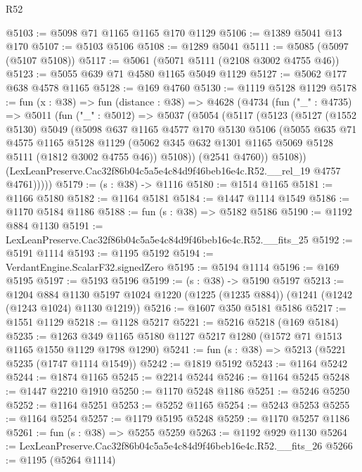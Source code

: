 \begin{lexlean}{R52}
\begin{coremodule}
@5103 := @5098 @71 @1165 @1165 @170 @1129
@5106 := @1389 @5041 @13 @170
@5107 := @5103 @5106
@5108 := @1289 @5041
@5111 := @5085 (@5097 (@5107 @5108))
@5117 := @5061 (@5071 @5111 (@2108 @3002 @4755 @46))
@5123 := @5055 @639 @71 @4580 @1165 @5049 @1129
@5127 := @5062 @177 @638 @4578 @1165
@5128 := @169 @4760
@5130 := @1119 @5128 @1129
@5178 := fun (x : @38) =>
  fun (distance : @38) =>
  @4628
    (@4734
      (fun ("_" : @4735) =>
      @5011
        (fun ("_" : @5012) =>
        @5037
          (@5054
            (@5117
              (@5123
                (@5127
                  (@1552 @5130)
                  @5049
                  (@5098
                    @637
                    @1165
                    @4577
                    @170
                    @5130
                    @5106
                    (@5055
                      @635
                      @71
                      @4575
                      @1165
                      @5128
                      @1129
                      (@5062 @345 @632 @1301 @1165 @5069 @5128 @5111 (@1812 @3002 @4755 @46))
                      @5108))
                  (@2541 @4760))
                @5108))
            (LexLeanPreserve.Cac32f86b04c5a5e4c84d9f46beb16e4c.R52.__rel_19 @4757 @4761)))))
@5179 := (s : @38) -> @1116
@5180 := @1514 @1165
@5181 := @1166 @5180
@5182 := @1164 @5181
@5184 := @1447 @1114 @1549
@5186 := @1170 @5184 @1186
@5188 := fun (s : @38) => @5182 @5186
@5190 := @1192 @884 @1130
@5191 := LexLeanPreserve.Cac32f86b04c5a5e4c84d9f46beb16e4c.R52.__fits_25
@5192 := @5191 @1114
@5193 := @1195 @5192
@5194 := VerdantEngine.ScalarF32.signedZero
@5195 := @5194 @1114
@5196 := @169 @5195
@5197 := @5193 @5196
@5199 := (s : @38) -> @5190 @5197
@5213 := @1204
    @884
    @1130
    @5197
    @1024
    @1220
    (@1225 (@1235 @884))
    (@1241 (@1242 (@1243 @1024) @1130 @1219))
@5216 := @1607 @350 @5181 @5186
@5217 := @1551 @1129
@5218 := @1128 @5217
@5221 := @5216 @5218 (@169 @5184)
@5235 := @1263 @349 @1165 @5180 @1127 @5217 @1280 (@1572 @71 @1513 @1165 @1550 @1129 @1798 @1290)
@5241 := fun (s : @38) => @5213 (@5221 @5235 (@1747 @1114 @1549))
@5242 := @1819 @5192
@5243 := @1164 @5242
@5244 := @1874 @1165
@5245 := @2214 @5244
@5246 := @1164 @5245
@5248 := @1447 @2210 @1910
@5250 := @1170 @5248 @1186
@5251 := @5246 @5250
@5252 := @1164 @5251
@5253 := @5252 @1165
@5254 := @5243 @5253
@5255 := @1164 @5254
@5257 := @1179 @5195 @5248
@5259 := @1170 @5257 @1186
@5261 := fun (s : @38) => @5255 @5259
@5263 := @1192 @929 @1130
@5264 := LexLeanPreserve.Cac32f86b04c5a5e4c84d9f46beb16e4c.R52.__fits_26
@5266 := @1195 (@5264 @1114)

\end{coremodule}
\end{lexlean}
